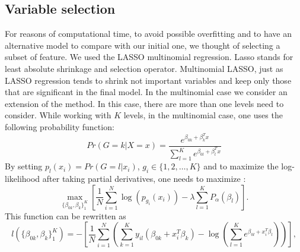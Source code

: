 \subsection{Variable selection}
    For reasons of computational time, to avoid possible overfitting 
    and to have an alternative model to compare with our initial one, 
    we thought of selecting a subset of feature. We used the LASSO 
    multinomial regression. Lasso stands for least absolute shrinkage 
    and selection operator. Multinomial LASSO, just as LASSO regression 
    tends to shrink not important variables and keep only those that 
    are significant in the final model. 
    In the multinomial case we consider an extension of the method. 
    In this case, there are more than one levels need to consider. 
    While working with $K$ levels, in the multinomial case, one uses 
    the following probability function:
    \begin{equation}
        Pr(G=k|X=x)=\frac{e^{\beta_{0k}+\beta_k^T x}} {\sum_{l=1}^K e^{\beta_{0l}+\beta_l^T x}}  
    \end{equation}
    By setting $p_l(x_i)=Pr(G=l|x_i)$, $g_i\in \{1,2, \hdots, K\}$ and to
    maximize the log-likelihood after taking partial derivatives, one needs to maximize \parencite{Friedman_2010}: 
    \begin{equation}
        \max_{\{\beta_{0k},\beta_k\}_1^K}
        \left[
            \frac{1}{N}\sum_{i=1}^N 
            \log(p_{g_i}(x_i))-\lambda \sum_{l=1}^K P_\alpha (\beta_l) 
        \right].  
    \end{equation}
    This function can be rewritten as
    \begin{equation}
        l(\{\beta_{0k},\beta_k\}_1^K)=
        -\left[ 
            \frac{1}{N} \sum_{i=1}^N
            \left( 
                \sum_{k=1}^Ky_{il}(\beta_{0k}+x_i^T\beta_k)-
                \log\left(
                    \sum_{l=1}^K e^{\beta_{0l}+x_i^T\beta_l}
                \right)
            \right)
        \right],  
    \end{equation} 
